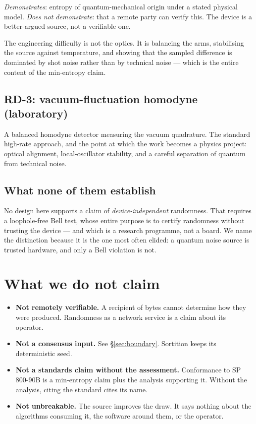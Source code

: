 \documentclass[11pt,a4paper]{article}
\begin{document}
\emph{Demonstrates}: entropy of quantum-mechanical origin under a stated
physical model. \emph{Does not demonstrate}: that a remote party can verify
this. The device is a better-argued source, not a verifiable one.

The engineering difficulty is not the optics. It is balancing the arms,
stabilising the source against temperature, and showing that the sampled
difference is dominated by shot noise rather than by technical noise --- which
is the entire content of the min-entropy claim.

\subsection{RD-3: vacuum-fluctuation homodyne (laboratory)}

A balanced homodyne detector measuring the vacuum quadrature. The standard
high-rate approach, and the point at which the work becomes a physics project:
optical alignment, local-oscillator stability, and a careful separation of
quantum from technical noise.

\subsection{What none of them establish}

No design here supports a claim of \emph{device-independent} randomness. That
requires a loophole-free Bell test, whose entire purpose is to certify
randomness without trusting the device --- and which is a research programme,
not a board. We name the distinction because it is the one most often elided:
a quantum noise source is trusted hardware, and only a Bell violation is not.

\section{What we do not claim}

\begin{itemize}
\item \textbf{Not remotely verifiable.} A recipient of bytes cannot determine
how they were produced. Randomness as a network service is a claim about its
operator.
\item \textbf{Not a consensus input.} See \S\ref{sec:boundary}. Sortition keeps
its deterministic seed.
\item \textbf{Not a standards claim without the assessment.} Conformance to SP
800-90B is a min-entropy claim plus the analysis supporting it. Without the
analysis, citing the standard cites its name.
\item \textbf{Not unbreakable.} The source improves the draw. It says nothing
about the algorithms consuming it, the software around them, or the operator.
\end{itemize}
\end{document}
